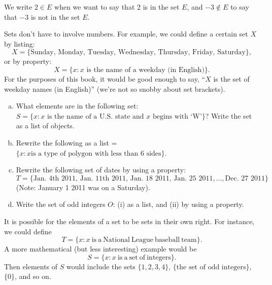 We write $2 \in E$ when we want to say that 2 is in the set $E$, and $-3 \notin E$ to say that $-3$ is not in the set $E$.

Sets don't have to involve numbers. For example, we could define a certain set $X$ by listing:
\[
X = \{\textrm{Sunday, Monday, Tuesday, Wednesday, Thursday, Friday, Saturday} \},
\]
or by property:
\[
X = \{ x :x \text{ is the name of a weekday (in English)}\}.
\]
For the purposes of this book, it would be good enough to say, ``$X$ is the set of weekday names (in English)'' (we're not so snobby about set brackets).



\begin{exercise}{}
\begin{enumerate}[(a)]
\item
What elements are in the following set:  $S = \{x : x  \textrm{ is the name of a U.S. state and } x  \textrm{ begins with `W'} \}$?  Write the set as a list of objects.
\item
Rewrite the following as a list =$\{x : x \textrm{is a type of polygon with less than 6 sides} \}$.
\item
Rewrite the following set of dates by using a property:  $T = \{ \textrm{Jan. 4th  2011, Jan. 11th  2011, Jan. 18  2011, Jan. 25  2011}, \ldots, \textrm{Dec. 27 2011} \}$ (Note: January 1 2011 was on a Saturday).
\item
Write the set of odd integers $O$: (i) as a list, and (ii) by using a property.
\end{enumerate}
\end{exercise}

It is possible for the elements of a set to be sets in their own right. For instance,  we could define
\[T = \{ x : x \mathrm{~is~a~National~League~baseball~team} \}. \]
A more mathematical (but less interesting) example would be
\[S = \{ x : x \mathrm{~is~a~set~of~integers} \}. \]
Then elements of $S$ would include the sets $\{1,2,3,4\}$, $\{\textrm{the set of odd integers}\}$, $\{ 0 \}$, and so on. 

